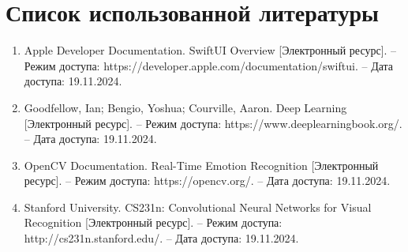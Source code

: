 {\section*{Список использованной литературы}
    \sloppy
    {
        \begin{enumerate}
           \item Apple Developer Documentation. SwiftUI Overview [Электронный ресурс]. – Режим доступа: https://developer.apple.com/documentation/swiftui. – Дата доступа: 19.11.2024.
        \item Goodfellow, Ian; Bengio, Yoshua; Courville, Aaron. Deep Learning [Электронный ресурс]. – Режим доступа: https://www.deeplearningbook.org/. – Дата доступа: 19.11.2024.
        \item OpenCV Documentation. Real-Time Emotion Recognition [Электронный ресурс]. – Режим доступа: https://opencv.org/. – Дата доступа: 19.11.2024.  
        \item Stanford University. CS231n: Convolutional Neural Networks for Visual Recognition [Электронный ресурс]. – Режим доступа: http://cs231n.stanford.edu/. – Дата доступа: 19.11.2024.  

        \end{enumerate}
    }

}